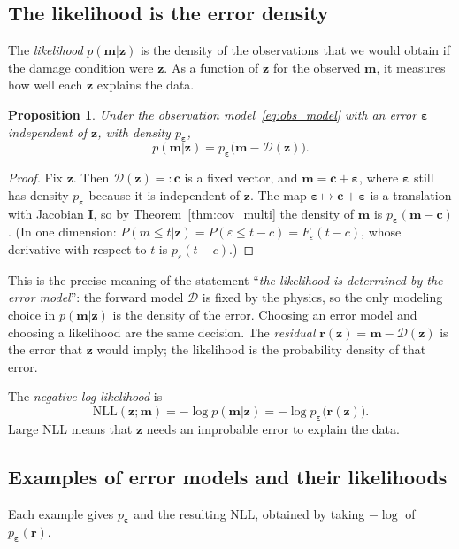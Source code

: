 \documentclass[11pt,a4paper]{article}
\numberwithin{equation}{section}
\theoremstyle{plain}
\newtheorem{proposition}{Proposition}[section]
\theoremstyle{definition}
\theoremstyle{remark}
\newcommand{\m}{\mathbf{m}}
\newcommand{\z}{\mathbf{z}}
\newcommand{\rr}{\mathbf{r}}
\newcommand{\eps}{\bm{\varepsilon}}
\newcommand{\I}{\mathbf{I}}
\newcommand{\NLL}{\mathrm{NLL}}
\newcommand{\Dc}{\mathcal{D}}
\begin{document}
\subsection{The likelihood is the error density}
The \emph{likelihood} $p(\m|\z)$ is the density of the observations that we would obtain if the damage condition were $\z$. As a function of $\z$ for the observed $\m$, it measures how well each $\z$ explains the data.

\begin{proposition}
\label{prop:likelihood}
Under the observation model~\eqref{eq:obs_model} with an error $\eps$ independent of $\z$, with density $p_{\eps}$,
\begin{equation}
p(\m|\z)=p_{\eps}\big(\m-\Dc(\z)\big).
\end{equation}
\end{proposition}
\begin{proof}
Fix $\z$. Then $\Dc(\z)=:\mathbf c$ is a fixed vector, and $\m=\mathbf c+\eps$, where $\eps$ still has density $p_{\eps}$ because it is independent of $\z$. The map $\eps\mapsto\mathbf c+\eps$ is a translation with Jacobian $\I$, so by Theorem~\ref{thm:cov_multi} the density of $\m$ is $p_{\eps}(\m-\mathbf c)$. (In one dimension: $P(m\le t|\z)=P(\varepsilon\le t-c)=F_{\varepsilon}(t-c)$, whose derivative with respect to $t$ is $p_\varepsilon(t-c)$.)
\end{proof}

This is the precise meaning of the statement ``\emph{the likelihood is determined by the error model}'': the forward model $\Dc$ is fixed by the physics, so the only modeling choice in $p(\m|\z)$ is the density of the error. Choosing an error model and choosing a likelihood are the same decision. The \emph{residual} $\rr(\z)=\m-\Dc(\z)$ is the error that $\z$ would imply; the likelihood is the probability density of that error.

The \emph{negative log-likelihood} is
\begin{equation}
\NLL(\z;\m)=-\log p(\m|\z)=-\log p_{\eps}\big(\rr(\z)\big).
\end{equation}
Large NLL means that $\z$ needs an improbable error to explain the data.

\subsection{Examples of error models and their likelihoods}
\label{sec:error_examples}
Each example gives $p_{\eps}$ and the resulting NLL, obtained by taking $-\log$ of $p_{\eps}(\rr)$.
\end{document}
